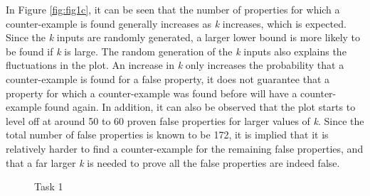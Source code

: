 \documentclass[11pt]{article}
\begin{document}
In Figure \ref{fig:fig1c}, it can be seen that the number of properties for which a counter-example is found generally increases as \emph{k} increases, which is expected. Since the \emph{k} inputs are randomly generated, a larger lower bound is more likely to be found if \emph{k} is large. The random generation of the \emph{k} inputs also explains the fluctuations in the plot. An increase in \emph{k} only increases the probability that a counter-example is found for a false property, it does not guarantee that a property for which a counter-example was found before will have a counter-example found again. In addition, it can also be observed that the plot starts to level off at around 50 to 60 proven false properties for larger values of \emph{k}. Since the total number of false properties is known to be 172, it is implied that it is relatively harder to find a counter-example for the remaining false properties, and that a far larger \emph{k} is needed to prove all the false properties are indeed false.

\begin{figure}[!htb]
  \centering
    \hfill
  \hfill
  \caption{Task 1}
\end{figure}
\end{document}
